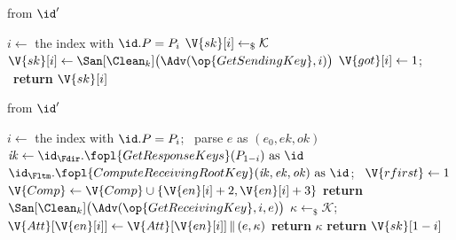 \begin{interface}
{ \quad from $\id'$
\begin{algorithmic}[1]
\algcont
{}
\State $i \gets$ the index with $\id.P = P_i$
 \label{ln:ckeonce}
\State $\V{sk}[i] \gets_{\$} \mathcal{K}$ \label{ln:ckesample}
  \State $\V{sk}[i] \gets \San[\Clean_{k}]\bigl(\Adv(\op{GetSendingKey}, i)\bigr)$ \label{ln:ckeoverwrite}
\EndIf
\State $\V{got}[i] \gets 1$; \ \textbf{return} $\V{sk}[i]$
\algsave
\end{algorithmic}
\vspace{1.4ex}

 \quad from $\id'$
\begin{algorithmic}[1]
\algcont
{}
\State $i \gets$ the index with $\id.P = P_i$; \ parse $e$ as $(e_0, \mathit{ek}, \mathit{ok})$
 \label{ln:ckedeleted}
   \label{ln:ckeresponder}
  \State $\mathit{ik} \gets \id_{\Fdir}.\fopl{GetResponseKeys}(P_{1-i}) \text{ as } \id$
  \State $\id_{\Fltm}.\fopl{ComputeReceivingRootKey}(\mathit{ik}, \mathit{ek}, \mathit{ok}) \text{ as } \id$; \ $\V{rfirst} \gets 1$
\EndIf
{} \label{ln:ckedelayheal}
  \State $\V{Comp} \gets \V{Comp} \cup \{\V{en}[i]+2, \V{en}[i]+3\}$
\EndIf
{}
  \State \textbf{return} $\San[\Clean_{k}]\bigl(\Adv(\op{GetReceivingKey}, i, e)\bigr)$ \label{ln:ckeadvkey}
\EndIf
{} \label{ln:ckemismatch}
  \State $\kappa \gets_{\$} \mathcal{K}$; \ $\V{Att}[\V{en}[i]] \gets \V{Att}[\V{en}[i]] \, \| \, (e, \kappa)$ \label{ln:ckerecord}
  \State \textbf{return} $\kappa$
\EndIf
\State \textbf{return} $\V{sk}[1-i]$ \label{ln:ckeagree}
\algsave
\end{algorithmic}
\vspace{1.4ex}

}
\end{interface}
